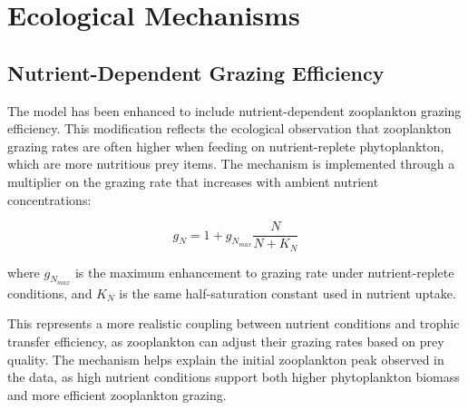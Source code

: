 \section{Ecological Mechanisms}

\subsection{Nutrient-Dependent Grazing Efficiency}

The model has been enhanced to include nutrient-dependent zooplankton grazing efficiency. This modification reflects the ecological observation that zooplankton grazing rates are often higher when feeding on nutrient-replete phytoplankton, which are more nutritious prey items. The mechanism is implemented through a multiplier on the grazing rate that increases with ambient nutrient concentrations:

\[ g_N = 1 + g_{N_{max}} \frac{N}{N + K_N} \]

where $g_{N_{max}}$ is the maximum enhancement to grazing rate under nutrient-replete conditions, and $K_N$ is the same half-saturation constant used in nutrient uptake.

This represents a more realistic coupling between nutrient conditions and trophic transfer efficiency, as zooplankton can adjust their grazing rates based on prey quality. The mechanism helps explain the initial zooplankton peak observed in the data, as high nutrient conditions support both higher phytoplankton biomass and more efficient zooplankton grazing.
